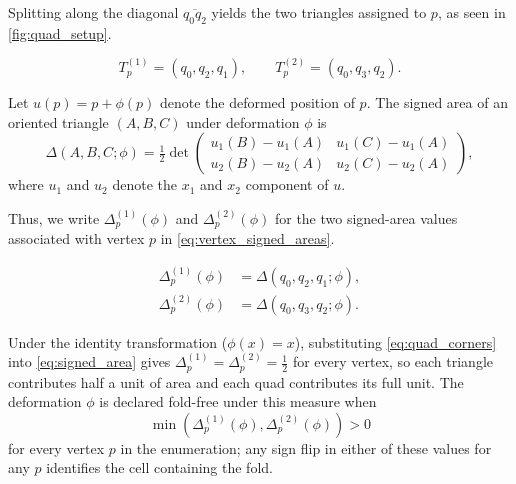 \documentclass[lettersize,journal]{IEEEtran}
\begin{document}
Splitting along the diagonal $\overline{q_0 q_2}$ yields the two triangles assigned to $p$, as seen in \autoref{fig:quad_setup}.

\begin{equation} \label{eq:vertex_triangles}
    T^{(1)}_p = (q_0, q_2, q_1), \qquad T^{(2)}_p = (q_0, q_3, q_2).
\end{equation}

Let $u(p) = p + \phi(p)$ denote the deformed position of $p$. The signed area of an oriented triangle $(A, B, C)$ under deformation $\phi$ is
\begin{equation} \label{eq:signed_area}
    \Delta(A, B, C; \phi) = \tfrac{1}{2} \det\begin{pmatrix}
        u_1(B) - u_1(A) & u_1(C) - u_1(A) \\
        u_2(B) - u_2(A) & u_2(C) - u_2(A)
    \end{pmatrix},
\end{equation}
where $u_1$ and $u_2$ denote the $x_1$ and $x_2$ component of $u$.

Thus, we write $\Delta^{(1)}_p(\phi)$ and $\Delta^{(2)}_p(\phi)$ for the two signed-area values associated with vertex $p$ in \autoref{eq:vertex_signed_areas}.

\begin{equation} \label{eq:vertex_signed_areas}
    \begin{aligned}
        \Delta^{(1)}_p(\phi) &= \Delta(q_0, q_2, q_1; \phi), \\
        \Delta^{(2)}_p(\phi) &= \Delta(q_0, q_3, q_2; \phi).
    \end{aligned}
\end{equation}

Under the identity transformation ($\phi(x) = x$), substituting \autoref{eq:quad_corners} into \autoref{eq:signed_area} gives $\Delta^{(1)}_p = \Delta^{(2)}_p = \tfrac{1}{2}$ for every vertex, so each triangle contributes half a unit of area and each quad contributes its full unit. The deformation $\phi$ is declared fold-free under this measure when $$\min(\Delta^{(1)}_p(\phi), \Delta^{(2)}_p(\phi)) > 0$$ for every vertex $p$ in the enumeration; any sign flip in either of these values for any $p$ identifies the cell containing the fold.
\end{document}
